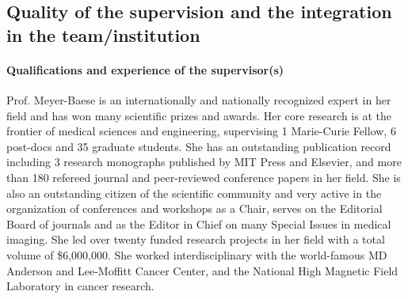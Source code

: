
 



\subsection{Quality of the supervision and the integration in the team/institution}
\label{sec:supervision}

\paragraph{Qualifications and experience of the supervisor(s)}

Prof. Meyer-Baese is an internationally and nationally recognized expert in her field and has won many scientific prizes and awards.
Her core research is at the frontier of medical sciences and engineering, supervising 1 Marie-Curie Fellow, 6 post-docs and 35 graduate students.
She has an outstanding publication record including 3 research monographs published by MIT Press and Elsevier, and more than 180 refereed journal and peer-reviewed conference papers in her field.
She is also an outstanding citizen of the scientific community and very active in the organization of conferences and workshops as a Chair, serves on the Editorial Board of journals and as the Editor in Chief on many Special Issues in medical imaging.
She led over twenty funded research projects in her field with a total volume of \$6,000,000.
She worked interdisciplinary with the world-famous MD Anderson and Lee-Moffitt Cancer Center, and the National High Magnetic Field Laboratory in cancer research.

